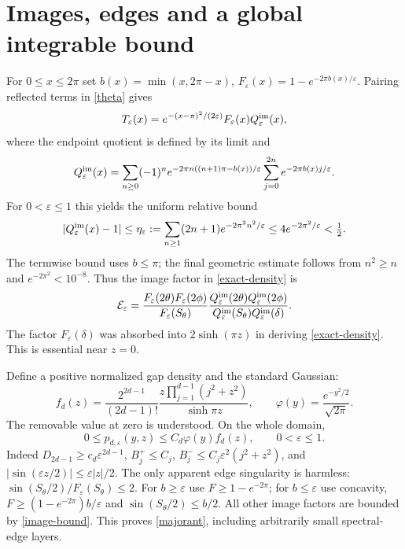 \documentclass[11pt]{article}
\newcommand{\eps}{\varepsilon}
\begin{document}
\section{Images, edges and a global integrable bound}
For $0\le x\le2\pi$ set $b(x)=\min(x,2\pi-x)$,
$F_\eps(x)=1-e^{-2\pi b(x)/\eps}$. Pairing reflected terms in
\eqref{theta} gives
\[
 T_\eps(x)=e^{-(x-\pi)^2/(2\eps)}F_\eps(x)Q_\eps^{\rm im}(x),
\]
where the endpoint quotient is defined by its limit and
\begin{equation}\label{image-series}
 Q_\eps^{\rm im}(x)=\sum_{n\ge0}(-1)^n
 e^{-2\pi n((n+1)\pi-b(x))/\eps}
 \sum_{j=0}^{2n}e^{-2\pi b(x)j/\eps}.
\end{equation}
For $0<\eps\le1$ this yields the uniform relative bound
\begin{equation}\label{image-bound}
 |Q_\eps^{\rm im}(x)-1|\le
 \eta_\eps:=\sum_{n\ge1}(2n+1)e^{-2\pi^2n^2/\eps}
 \le4e^{-2\pi^2/\eps}<\tfrac12.
\end{equation}
The termwise bound uses $b\le\pi$; the final geometric estimate
follows from $n^2\ge n$ and $e^{-2\pi^2}<10^{-8}$.
Thus the image factor in \eqref{exact-density} is
\begin{equation}\label{images}
 \mathcal E_\eps=
 \frac{F_\eps(2\theta)F_\eps(2\phi)}{F_\eps(S_\theta)}
 \frac{Q_\eps^{\rm im}(2\theta)Q_\eps^{\rm im}(2\phi)}
 {Q_\eps^{\rm im}(S_\theta)Q_\eps^{\rm im}(\delta)}.
\end{equation}
The factor $F_\eps(\delta)$ was absorbed into
$2\sinh(\pi z)$ in deriving \eqref{exact-density}.
This is essential near $z=0$.

Define a positive normalized gap density and the standard Gaussian:
\begin{equation}\label{leading}
 f_d(z)=\frac{2^{2d-1}}{(2d-1)!}
 \frac{z\prod_{j=1}^{d-1}(j^2+z^2)}{\sinh\pi z},\qquad
 \varphi(y)=\frac{e^{-y^2/2}}{\sqrt{2\pi}}.
\end{equation}
The removable value at zero is understood. On the whole domain,
\begin{equation}\label{majorant}
 0\le p_{d,\eps}(y,z)\le C_d\varphi(y)f_d(z),
 \qquad 0<\eps\le1.
\end{equation}
Indeed $D_{2d-1}\ge c_d\eps^{2d-1}$,
$B_j^+\le C_j$, $B_j^-\le C_j\eps^2(j^2+z^2)$,
and $|\sin(\eps z/2)|\le\eps|z|/2$.
The only apparent edge singularity is harmless:
$\sin(S_\theta/2)/F_\eps(S_\theta)\le2$.
For $b\ge\eps$ use $F\ge1-e^{-2\pi}$; for $b\le\eps$
use concavity, $F\ge(1-e^{-2\pi})b/\eps$ and
$\sin(S_\theta/2)\le b/2$. All other image factors are
bounded by \eqref{image-bound}. This proves \eqref{majorant},
including arbitrarily small spectral-edge layers.
\end{document}
